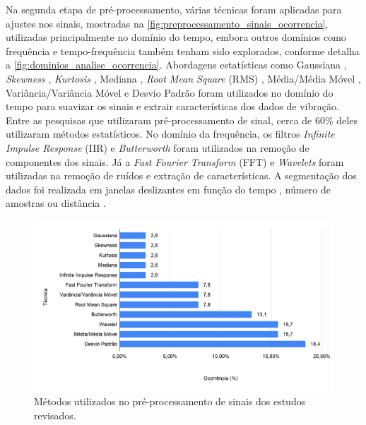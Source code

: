 Na segunda etapa de pré-processamento, várias técnicas foram aplicadas para ajustes nos sinais, mostradas na \autoref{fig:preprocessamento_sinais_ocorrencia}, utilizadas principalmente no domínio do tempo, embora outros domínios como frequência e tempo-frequência também tenham sido explorados, conforme detalha a \autoref{fig:dominios_analise_ocorrencia}. Abordagens estatísticas como Gaussiana \cite{Pooja2017}, \textit{Skewness} \cite{Alqudah2016}, \textit{Kurtosis} \cite{Alqudah2016}, Mediana \cite{Alqudah2016,Li2016}, \textit{Root Mean Square} (RMS) \cite{Jang2015,Li2018,Sharma2015}, Média/Média Móvel \cite{Alqudah2016,Andria2016,Bose2018,Li2016, Pholprasit2015,Savera2016,Singh2017}, Variância/Variância Móvel \cite{Alqudah2016,Andria2016} e Desvio Padrão \cite{Andria2016,BelloSalau2018,Hou2017,Lima2016,Pholprasit2015,Prapulla2017} foram utilizados no domínio do tempo para suavizar os sinais e extrair características dos dados de vibração. Entre as pesquisas que utilizaram pré-processamento de sinal, cerca de 60\% deles utilizaram métodos estatísticos. No domínio da frequência, os filtros \textit{Infinite Impulse Response} (IIR) \cite{Wu2018} e \textit{Butterworth} \cite{Hou2017,Niskanen2015,Pitonak2016,Souza2018,Wu2013} foram utilizados na remoção de componentes dos sinais. Já a \textit{Fast Fourier Transform} (FFT) \cite{Allouch2017,Douangphachanh2013,Douangphachanh2014} e \textit{Wavelets} \cite{BelloSalau2018,Eftekhari2018,El-Wakeel2018,Gueta2017,Singh2017,Wang2018} foram utilizadas na remoção de ruídos e extração de características. A segmentação dos dados foi realizada em janelas deslizantes em função do tempo \cite{Wang2018}, número de amostras \cite{Singh2017} ou distância \cite{Li2018}. 

\begin{figure}[h!]
  \centering
  \caption{Métodos utilizados no pré-processamento de sinais dos estudos revisados.}
   \label{fig:preprocessamento_sinais_ocorrencia}
   \includegraphics[width=1\textwidth]{figuras/fig_17.png}
\end{figure}

